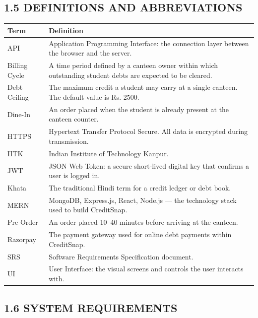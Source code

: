\documentclass[a4paper,12pt]{article}
\begin{document}
\subsection*{1.5 DEFINITIONS AND ABBREVIATIONS}
\label{sec:definitions}

\vspace{0.3cm}
\renewcommand{\arraystretch}{1.4}
\setlength{\arrayrulewidth}{1pt}
\begin{tabular}{|p{3.5cm}|p{10.5cm}|}
\hline
\rowcolor{gray!20}\textbf{Term} & \textbf{Definition} \\ \hline
API & Application Programming Interface: the connection layer between the browser and the server. \\ \hline
Billing Cycle & A time period defined by a canteen owner within which outstanding student debts are expected to be cleared. \\ \hline
Debt Ceiling & The maximum credit a student may carry at a single canteen. The default value is Rs. 2500. \\ \hline
Dine-In & An order placed when the student is already present at the canteen counter. \\ \hline
HTTPS & Hypertext Transfer Protocol Secure. All data is encrypted during transmission. \\ \hline
IITK & Indian Institute of Technology Kanpur. \\ \hline
JWT & JSON Web Token: a secure short-lived digital key that confirms a user is logged in. \\ \hline
Khata & The traditional Hindi term for a credit ledger or debt book. \\ \hline
MERN & MongoDB, Express.js, React, Node.js --- the technology stack used to build CreditSnap. \\ \hline
Pre-Order & An order placed 10--40 minutes before arriving at the canteen. \\ \hline
Razorpay & The payment gateway used for online debt payments within CreditSnap. \\ \hline
SRS & Software Requirements Specification document. \\ \hline
UI & User Interface: the visual screens and controls the user interacts with. \\ \hline
\end{tabular}

\subsection*{1.6 SYSTEM REQUIREMENTS}
\label{sec:sysreq}
\end{document}
